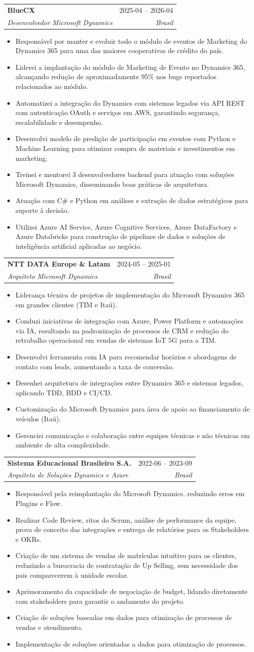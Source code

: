 \documentclass[a4paper,11pt]{article}
\makeatletter
\newcommand{\resumeItem}[1]{
  \item\small{
    {#1 \vspace{-2pt}}
  }
}
\newcommand{\resumeSubheading}[4]{
  \vspace{-1pt}\item
  \begin{tabular*}{0.97\textwidth}{l@{\extracolsep{\fill}}r}
    \textbf{#1} & #2 \\
    \textit{\small#3} & \textit{\small #4} \\
  \end{tabular*}\vspace{-5pt}
}
\newcommand{\resumeItemListStart}{\begin{itemize}}
\newcommand{\resumeItemListEnd}{\end{itemize}\vspace{-5pt}}
\makeatother
\begin{document}
\resumeSubheading
{BlueCX}{2025-04 – 2026-04}
{Desenvolvedor Microsoft Dynamics}{Brasil}
\resumeItemListStart
\resumeItem{Responsável por manter e evoluir todo o módulo de eventos de Marketing do Dynamics 365 para uma das maiores cooperativas de crédito do país.}
\resumeItem{Liderei a implantação do módulo de Marketing de Evento no Dynamics 365, alcançando redução de aproximadamente 95\% nos bugs reportados relacionados ao módulo.}
\resumeItem{Automatizei a integração do Dynamics com sistemas legados via API REST com autenticação OAuth e serviços em AWS, garantindo segurança, escalabilidade e desempenho.}
\resumeItem{Desenvolvi modelo de predição de participação em eventos com Python e Machine Learning para otimizar compra de materiais e investimentos em marketing.}
\resumeItem{Treinei e mentorei 3 desenvolvedores backend para atuação com soluções Microsoft Dynamics, disseminando boas práticas de arquitetura.}
\resumeItem{Atuação com C\# e Python em análises e extração de dados estratégicos para suporte à decisão.}
\resumeItem{Utilizei Azure AI Service, Azure Cognitive Services, Azure DataFactory e Azure Databricks para construção de pipelines de dados e soluções de inteligência artificial aplicadas ao negócio.}
\resumeItemListEnd

\resumeSubheading
{NTT DATA Europe \& Latam}{2024-05 – 2025-01}
{Arquiteto Microsoft Dynamics}{Brasil}
\resumeItemListStart
\resumeItem{Liderança técnica de projetos de implementação do Microsoft Dynamics 365 em grandes clientes (TIM e Itaú).}
\resumeItem{Conduzi iniciativas de integração com Azure, Power Platform e automações via IA, resultando na padronização de processos de CRM e redução do retrabalho operacional em vendas de sistemas IoT 5G para a TIM.}
\resumeItem{Desenvolvi ferramenta com IA para recomendar horários e abordagens de contato com leads, aumentando a taxa de conversão.}
\resumeItem{Desenhei arquitetura de integrações entre Dynamics 365 e sistemas legados, aplicando TDD, BDD e CI/CD.}
\resumeItem{Customização do Microsoft Dynamics para área de apoio ao financiamento de veículos (Itaú).}
\resumeItem{Gerenciei comunicação e colaboração entre equipes técnicas e não técnicas em ambiente de alta complexidade.}
\resumeItemListEnd

\resumeSubheading
{Sistema Educacional Brasileiro S.A.}{2022-06 – 2023-09}
{Arquiteto de Soluções Dynamics e Azure}{Brasil}
\resumeItemListStart
\resumeItem{Responsável pela reimplantação do Microsoft Dynamics, reduzindo erros em Plugins e Flow.}
\resumeItem{Realizar Code Review, ritos do Scrum, análise de performance da equipe, prova de conceito das integrações e entrega de relatórios para os Stakeholders e OKRs.}
\resumeItem{Criação de um sistema de vendas de matrículas intuitivo para os clientes, reduzindo a burocracia de contratação de Up Selling, sem necessidade dos pais comparecerem à unidade escolar.}
\resumeItem{Aprimoramento da capacidade de negociação de budget, lidando diretamente com stakeholders para garantir o andamento do projeto.}
\resumeItem{Criação de soluções baseadas em dados para otimização de processos de vendas e atendimento.}
\resumeItem{Implementação de soluções orientadas a dados para otimização de processos.}
\resumeItemListEnd
\end{document}
